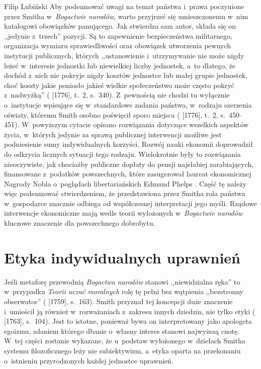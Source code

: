\begin{artplenv}{Filip Lubiński}
Aby podsumować uwagi na temat państwa i~prawa poczynione przez Smitha w~\textit{Bogactwie narodów}, warto przyjrzeć
się umieszczonemu w~nim katalogowi obowiązków panującego. Jak stwierdza sam autor, składa się on ,,jedynie z~trzech''
pozycji. Są to zapewnienie bezpieczeństwa militarnego, organizacja wymiaru sprawiedliwości oraz obowiązek utworzenia
pewnych instytucji publicznych, których ,,ustanowienie i~utrzymywanie nie może nigdy leżeć w~interesie jednostki lub
niewielkiej liczby jednostek, a~to dlatego, że dochód z~nich nie pokryje nigdy kosztów jednostce lub małej grupie
jednostek, choć koszty jakie poniosło jakieś wielkie społeczeństwo może często pokryć z~nadwyżką''
(\cite{smith_badania_2007} [1776], t.~2, s.~340).
Z~pewnością nie chodzi tu wyłącznie o~instytucje wpisujące
się w~standardowe zadania państwa, w~rodzaju szerzenia oświaty, któremu Smith osobno poświęcił sporo miejsca
(\cite{smith_badania_2007} [1776], t.~2, s.~450--451).
W~powyższym cytacie opisano rozwiązania dotyczące
wszelkich aspektów życia, w~których jedynie za sprawą publicznej interwencji możliwe jest podniesienie sumy
indywidualnych korzyści. Rozwój nauki ekonomii doprowadził do odkrycia licznych sytuacji tego rodzaju. Wielokrotnie
były to rozwiązania nieoczywiste, jak chociażby publiczne dopłaty do pensji najsłabiej zarabiających,
finansowane z~podatków powszechnych, które zasugerował laureat ekonomicznej Nagrody Nobla o~poglądach libertariańskich Edmund Phelps
\parencite{phelps_placa_2013}.
Część tę należy więc podsumować stwierdzeniem, że przedstawiona przez Smitha
rola państwa w~gospodarce znacznie odbiega od współczesnej interpretacji jego myśli. Rządowe interwencje ekonomiczne
mają wedle teorii wyłożonych w~\textit{Bogactwie narodów} kluczowe znaczenie dla powszechnego dobrobytu. 

\section{Etyka indywidualnych uprawnień}
Jeśli metaforę przewodnią \textit{Bogactwa narodów} stanowi ,,niewidzialna ręka'' to w~przypadku \textit{Teorii uczuć
moralnych} rolę tę pełni bez wątpienia ,,bezstronny obserwator''
(\cite{smith_teoria_1989} [1759], s.~163).
Smith przyznał tej koncepcji duże znaczenie i~umieścił ją również w~rozważaniach z~zakresu innych dziedzin, nie tylko
etyki
(\cite{smith_lectures_1982} [1763], s.~104).
Jest to istotne, ponieważ bywa on interpretowany jako
apologeta egoizmu, zdaniem którego dbanie o~własny interes stanowi najwyższą cnotę. W~tej części zostanie wykazane,
że u~podstaw wyłożonego w~dziełach Smitha systemu filozoficznego leży nie subiektywizm, a~etyka oparta na
przekonaniu o~istnieniu przyrodzonych każdej jednostce uprawnień.


\end{artplenv}

